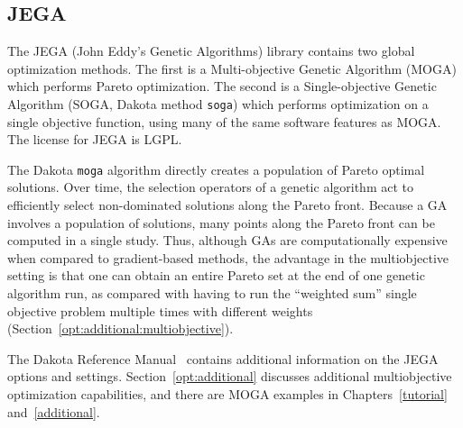 \subsection{JEGA}\label{opt:software:jega}



The JEGA (John Eddy's Genetic Algorithms) library contains two global
optimization methods. The first is a Multi-objective Genetic Algorithm
(MOGA) which performs Pareto optimization. The second is a
Single-objective Genetic Algorithm (SOGA, Dakota method \texttt{soga})
which performs optimization on a single objective function, using many
of the same software features as MOGA. The license for JEGA is LGPL.

The Dakota \texttt{moga} algorithm directly creates a population of
Pareto optimal solutions. Over time, the selection operators of a
genetic algorithm act to efficiently select non-dominated solutions
along the Pareto front. Because a GA involves a population of
solutions, many points along the Pareto front can be computed in a
single study. Thus, although GAs are computationally expensive when
compared to gradient-based methods, the advantage in the
multiobjective setting is that one can obtain an entire Pareto set at
the end of one genetic algorithm run, as compared with having to run
the ``weighted sum'' single objective problem multiple times with
different weights (Section~\ref{opt:additional:multiobjective}).

The Dakota Reference Manual~\cite{RefMan} contains additional
information on the JEGA options and settings.
Section~\ref{opt:additional} discusses additional multiobjective
optimization capabilities, and there are MOGA examples in
Chapters~\ref{tutorial} and~\ref{additional}.

